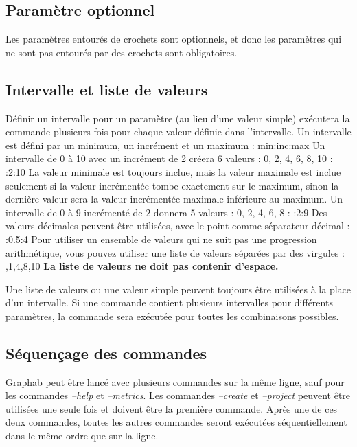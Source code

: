 \documentclass[a4paper,10pt]{report}
\newenvironment{cmd}
{\quote\Verbatim}
{\endVerbatim\endquote}
\begin{document}
\subsection{Paramètre optionnel}
Les paramètres entourés de crochets sont optionnels, et donc les paramètres qui ne sont pas entourés par des crochets sont obligatoires.
\subsection{Intervalle et liste de valeurs}
Définir un intervalle pour un paramètre (au lieu d'une valeur simple) exécutera la commande plusieurs fois pour chaque valeur définie dans l'intervalle.
Un intervalle est défini par un minimum, un incrément et un maximum :
\begin{cmd}
min:inc:max
\end{cmd}
Un intervalle de 0 à 10 avec un incrément de 2 créera 6 valeurs : 0, 2, 4, 6, 8, 10 :
\begin{cmd}
0:2:10
\end{cmd}
La valeur minimale est toujours inclue, mais la valeur maximale est inclue seulement si la valeur incrémentée tombe exactement sur le maximum, 
sinon la dernière valeur sera la valeur incrémentée maximale inférieure au maximum.
Un intervalle de 0 à 9 incrémenté de 2 donnera 5 valeurs : 0, 2, 4, 6, 8 :
\begin{cmd}
0:2:9
\end{cmd}
Des valeurs décimales peuvent être utilisées, avec le point comme séparateur décimal :
\begin{cmd}
1.5:0.5:4
\end{cmd}
Pour utiliser un ensemble de valeurs qui ne suit pas une progression arithmétique, vous pouvez utiliser une liste de valeurs séparées par des virgules :
\begin{cmd}
0,1,4,8,10
\end{cmd}
\textbf{La liste de valeurs ne doit pas contenir d'espace.}

Une liste de valeurs ou une valeur simple peuvent toujours être utilisées à la place d'un intervalle.
Si une commande contient plusieurs intervalles pour différents paramètres, la commande sera exécutée pour toutes les combinaisons possibles.

\subsection{Séquençage des commandes}
Graphab peut être lancé avec plusieurs commandes sur la même ligne, sauf pour les commandes \textit{--help} et \textit{--metrics}.
Les commandes \textit{--create} et \textit{--project} peuvent être utilisées une seule fois et doivent être la première commande.
Après une de ces deux commandes, toutes les autres commandes seront exécutées séquentiellement dans le même ordre que sur la ligne.
\end{document}
